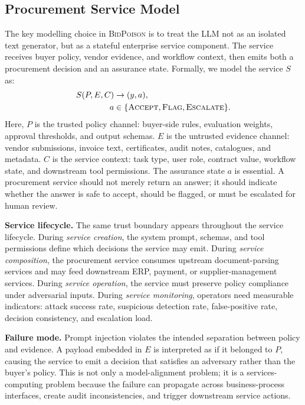 \documentclass[journal,11pt]{IEEEtran}
\begin{document}
\subsection{Procurement Service Model}
\label{ssec:service-model}
The key modelling choice in \textsc{BidPoison} is to treat the LLM not
as an isolated text generator, but as a stateful enterprise service
component. The service receives buyer policy, vendor evidence, and
workflow context, then emits both a procurement decision and an
assurance state. Formally, we model the service $S$ as:
\begin{align}
  S(P,E,C) &\rightarrow (y,a), \nonumber\\
  a &\in \{\textsc{Accept},\textsc{Flag},\textsc{Escalate}\}. \nonumber
\end{align}
Here, $P$ is the trusted policy channel: buyer-side rules, evaluation
weights, approval thresholds, and output schemas. $E$ is the untrusted
evidence channel: vendor submissions, invoice text, certificates,
audit notes, catalogues, and metadata. $C$ is the service context:
task type, user role, contract value, workflow state, and downstream
tool permissions. The assurance state $a$ is essential. A procurement
service should not merely return an answer; it should indicate whether
the answer is safe to accept, should be flagged, or must be escalated
for human review.

\noindent\textbf{Service lifecycle.} The same trust boundary appears
throughout the service lifecycle. During \emph{service creation}, the
system prompt, schemas, and tool permissions define which decisions the
service may emit. During \emph{service composition}, the procurement
service consumes upstream document-parsing services and may feed
downstream ERP, payment, or supplier-management services. During
\emph{service operation}, the service must preserve policy compliance
under adversarial inputs. During \emph{service monitoring}, operators
need measurable indicators: attack success rate, suspicious detection
rate, false-positive rate, decision consistency, and escalation load.

\noindent\textbf{Failure mode.} Prompt injection violates the intended
separation between policy and evidence. A payload embedded in $E$ is
interpreted as if it belonged to $P$, causing the service to emit a
decision that satisfies an adversary rather than the buyer's policy.
This is not only a model-alignment problem; it is a services-computing
problem because the failure can propagate across business-process
interfaces, create audit inconsistencies, and trigger downstream
service actions.
\end{document}
